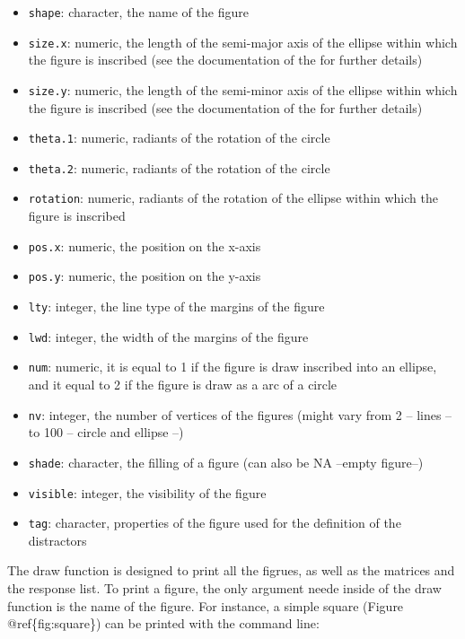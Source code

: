 \begin{itemize}
\tightlist
\item
  \texttt{shape}: character, the name of the figure
\item
  \texttt{size.x}: numeric, the length of the semi-major axis of the ellipse within which the figure is inscribed (see the documentation of the  for further details)
\item
  \texttt{size.y}: numeric, the length of the semi-minor axis of the ellipse within which the figure is inscribed (see the documentation of the  for further details)
\item
  \texttt{theta.1}: numeric, radiants of the rotation of the circle
\item
  \texttt{theta.2}: numeric, radiants of the rotation of the circle
\item
  \texttt{rotation}: numeric, radiants of the rotation of the ellipse within which the figure is inscribed
\item
  \texttt{pos.x}: numeric, the position on the x-axis
\item
  \texttt{pos.y}: numeric, the position on the y-axis
\item
  \texttt{lty}: integer, the line type of the margins of the figure
\item
  \texttt{lwd}: integer, the width of the margins of the figure
\item
  \texttt{num}: numeric, it is equal to 1 if the figure is draw inscribed into an ellipse, and it equal to 2 if the figure is draw as a arc of a circle
\item
  \texttt{nv}: integer, the number of vertices of the figures (might vary from 2 -- lines -- to 100 -- circle and ellipse --)
\item
  \texttt{shade}: character, the filling of a figure (can also be NA --empty figure--)
\item
  \texttt{visible}: integer, the visibility of the figure
\item
  \texttt{tag}: character, properties of the figure used for the definition of the distractors
\end{itemize}

The draw function is designed to print all the figrues, as well as the matrices and the response list. To print a figure, the only argument neede inside of the draw function is the name of the figure. For instance, a simple square (Figure @ref\{fig:square\}) can be printed with the command line:

